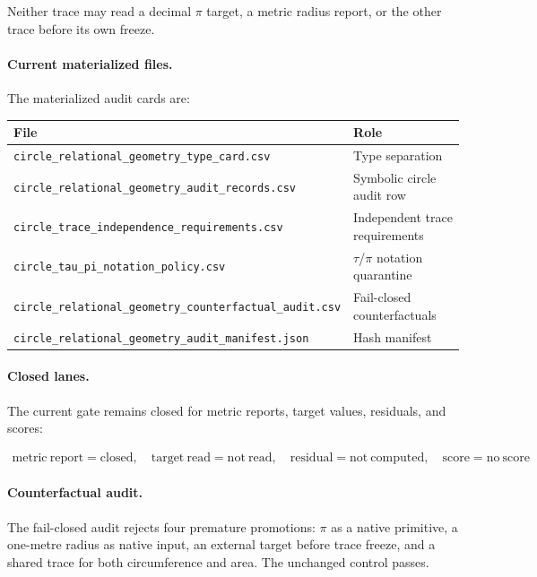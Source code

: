 Neither trace may read a decimal $\pi$ target, a metric radius report, or the other trace before its own freeze.

\paragraph{Current materialized files.}
The materialized audit cards are:

\begin{center}
\begin{tabular}{ll}
\toprule
File & Role\\
\midrule
\texttt{circle\_relational\_geometry\_type\_card.csv} & Type separation\\
\texttt{circle\_relational\_geometry\_audit\_records.csv} & Symbolic circle audit row\\
\texttt{circle\_trace\_independence\_requirements.csv} & Independent trace requirements\\
\texttt{circle\_tau\_pi\_notation\_policy.csv} & $\tau$/$\pi$ notation quarantine\\
\texttt{circle\_relational\_geometry\_counterfactual\_audit.csv} & Fail-closed counterfactuals\\
\texttt{circle\_relational\_geometry\_audit\_manifest.json} & Hash manifest\\
\bottomrule
\end{tabular}
\end{center}

\paragraph{Closed lanes.}
The current gate remains closed for metric reports, target values, residuals, and scores:

\[
\boxed{
\begin{array}{c}
\mathrm{metric\ report}=\mathrm{closed},\quad
\mathrm{target\ read}=\mathrm{not\ read},\quad
\mathrm{residual}=\mathrm{not\ computed},\quad
\mathrm{score}=\mathrm{no\ score}
\end{array}
}
\]

\paragraph{Counterfactual audit.}
The fail-closed audit rejects four premature promotions: $\pi$ as a native primitive, a one-metre radius as native input, an external target before trace freeze, and a shared trace for both circumference and area.  The unchanged control passes.
